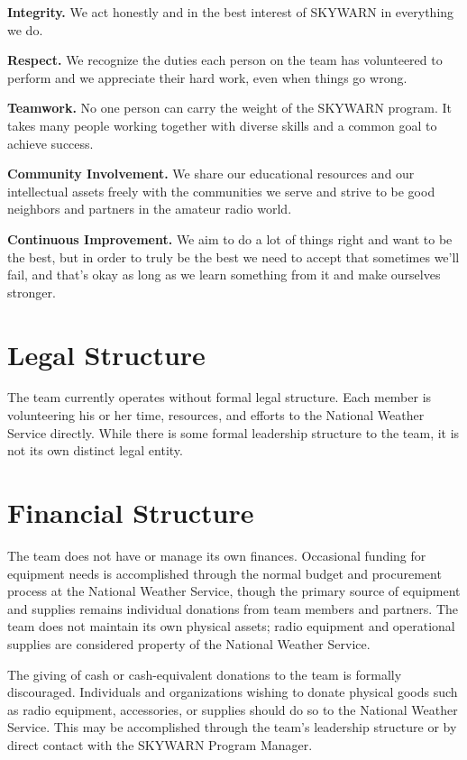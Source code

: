 \documentclass[pdflatex,letterpaper,twoside,12pt]{book}
\begin{document}
\textbf{Integrity.} We act honestly and in the best interest of SKYWARN in everything we do.

\textbf{Respect.} We recognize the duties each person on the team has volunteered to perform and we appreciate their hard work, even when things go wrong.

\textbf{Teamwork.} No one person can carry the weight of the SKYWARN program. It takes many people working together with diverse skills and a common goal to achieve success.

\textbf{Community Involvement.} We share our educational resources and our intellectual assets freely with the communities we serve and strive to be good neighbors and partners in the amateur radio world.

\textbf{Continuous Improvement.} We aim to do a lot of things right and want to be the best, but in order to truly be the best we need to accept that sometimes we'll fail, and that's okay as long as we learn something from it and make ourselves stronger.


\section{Legal Structure}

The team currently operates without formal legal structure.  Each member is volunteering his or her time, resources, and efforts to the National Weather Service directly.  While there is some formal leadership structure to the team, it is not its own distinct legal entity.


\section{Financial Structure}

The team does not have or manage its own finances.  Occasional funding for equipment needs is accomplished through the normal budget and procurement process at the National Weather Service, though the primary source of equipment and supplies remains individual donations from team members and partners.  The team does not maintain its own physical assets; radio equipment and operational supplies are considered property of the National Weather Service.

The giving of cash or cash-equivalent donations to the team is formally discouraged.  Individuals and organizations wishing to donate physical goods such as radio equipment, accessories, or supplies should do so to the National Weather Service.  This may be accomplished through the team's leadership structure or by direct contact with the SKYWARN Program Manager.
\end{document}
